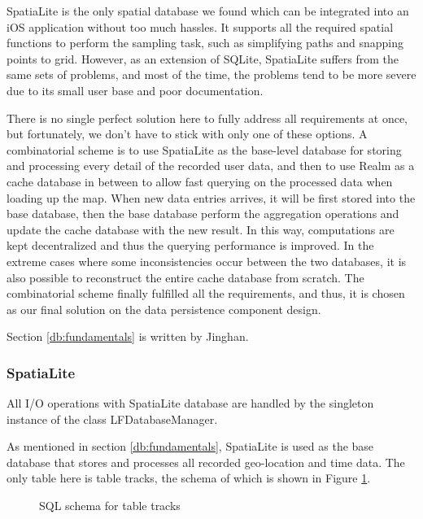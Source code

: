 \documentclass[12pt,a4paper]{article}
\renewcommand\texttt[1]{{\ttfamily\color{textttColor}#1}}
\begin{document}
            SpatiaLite is the only spatial database we found which can be integrated into an iOS application without too much hassles. It supports all the required spatial functions to perform the sampling task, such as simplifying paths and snapping points to grid. However, as an extension of SQLite, SpatiaLite suffers from the same sets of problems, and most of the time, the problems tend to be more severe due to its small user base and poor documentation.
            
            There is no single perfect solution here to fully address all requirements at once, but fortunately, we don't have to stick with only one of these options. A combinatorial scheme is to use SpatiaLite as the base-level database for storing and processing every detail of the recorded user data, and then to use Realm as a cache database in between to allow fast querying on the processed data when loading up the map. When new data entries arrives, it will be first stored into the base database, then the base database perform the aggregation operations and update the cache database with the new result. In this way, computations are kept decentralized and thus the querying performance is improved. In the extreme cases where some inconsistencies occur between the two databases, it is also possible to reconstruct the entire cache database from scratch. The combinatorial scheme finally fulfilled all the requirements, and thus, it is chosen as our final solution on the data persistence component design.
            
            \footnotesize
            Section \ref{db:fundamentals} is written by Jinghan.
            \normalsize
            
            \subsubsection{SpatiaLite} %
            \label{db:spatialite}
            
            All I/O operations with SpatiaLite database are handled by the singleton instance of the class \texttt{LFDatabaseManager}.
            
            As mentioned in section \ref{db:fundamentals}, SpatiaLite is used as the base database that stores and processes all recorded geo-location and time data. The only table here is table \texttt{tracks}, the schema of which is shown in Figure \ref{fig:schema}.
            
            \begin{figure}
                \lstset{style=sqlStyle}
                \centering
                
                \caption{SQL schema for table \texttt{tracks}}
                \label{fig:schema}
            \end{figure}
                
\end{document}

